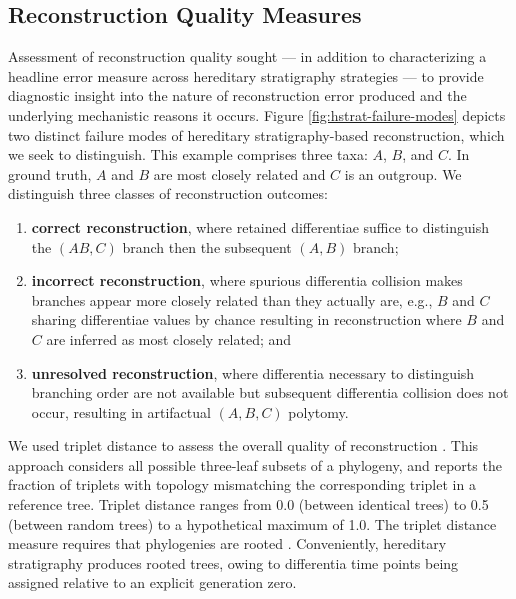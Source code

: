 \subsection{Reconstruction Quality Measures}



Assessment of reconstruction quality sought --- in addition to characterizing a headline error measure across hereditary stratigraphy strategies --- to provide diagnostic insight into the nature of reconstruction error produced and the underlying mechanistic reasons it occurs.
Figure \ref{fig:hstrat-failure-modes} depicts two distinct failure modes of hereditary stratigraphy-based reconstruction, which we seek to distinguish.
This example comprises three taxa: $A$, $B$, and $C$.
In ground truth, $A$ and $B$ are most closely related and $C$ is an outgroup.
We distinguish three classes of reconstruction outcomes:
\begin{enumerate}
\item \textbf{correct reconstruction}, where retained differentiae suffice to distinguish the $(AB,C)$ branch then the subsequent $(A,B)$ branch;
\item \textbf{incorrect reconstruction}, where spurious differentia collision makes branches appear more closely related than they actually are, e.g., $B$ and $C$ sharing differentiae values by chance resulting in reconstruction where $B$ and $C$ are inferred as most closely related; and
\item \textbf{unresolved reconstruction}, where differentia necessary to distinguish branching order are not available but subsequent differentia collision does not occur, resulting in artifactual $(A,B,C)$ polytomy.
\end{enumerate}

We used triplet distance to assess the overall quality of reconstruction \citep{critchlow1996triples}.
This approach considers all possible three-leaf subsets of a phylogeny, and reports the fraction of triplets with topology mismatching the corresponding triplet in a reference tree.
Triplet distance ranges from 0.0 (between identical trees) to 0.5 (between random trees) to a hypothetical maximum of 1.0.
The triplet distance measure requires that phylogenies are rooted \citep{estabrook1985comparison}.
Conveniently, hereditary stratigraphy produces rooted trees, owing to differentia time points being assigned relative to an explicit generation zero.

